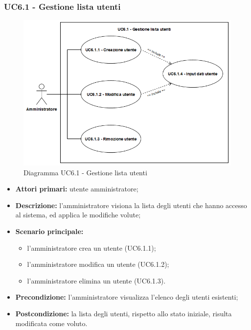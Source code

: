 \subsubsection{UC6.1 - Gestione lista utenti}
	\begin{figure}[h!]
		\centering
		\includegraphics[width=13cm]{images/UC6.1.png}
		\caption{Diagramma UC6.1 - Gestione lista utenti}
	\end{figure}
	\begin{itemize}
		\item \textbf{Attori primari:} utente amministratore;
		\item \textbf{Descrizione:} l'amministratore visiona la lista degli utenti che hanno accesso al sistema, ed applica le modifiche volute;
		\item \textbf{Scenario principale:} 
			\begin{itemize}
				\item l'amministratore crea un utente (UC6.1.1);
				\item l'amministratore modifica un utente (UC6.1.2);
				\item l'amministratore elimina un utente (UC6.1.3).
			\end{itemize}
		\item \textbf{Precondizione:} l'amministratore visualizza l'elenco degli utenti esistenti;
		\item \textbf{Postcondizione:} la lista degli utenti, rispetto allo stato iniziale, risulta modificata come voluto.
	\end{itemize}

